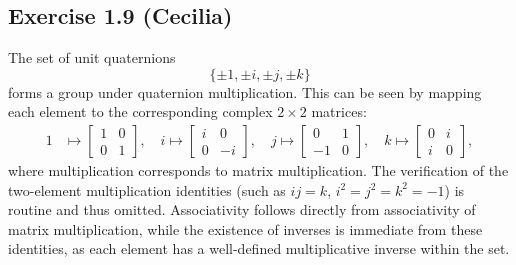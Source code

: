 \subsection*{Exercise 1.9 (Cecilia)}

The set of unit quaternions 
\[
\{\pm 1, \pm i, \pm j, \pm k\}
\]
forms a group under quaternion multiplication. This can be seen by mapping each element to the corresponding complex $2 \times 2$ matrices:
\[
\begin{aligned}
1 &\mapsto \begin{bmatrix} 1 & 0 \\ 0 & 1 \end{bmatrix}, \quad
i \mapsto \begin{bmatrix} i & 0 \\ 0 & -i \end{bmatrix}, \quad
j \mapsto \begin{bmatrix} 0 & 1 \\ -1 & 0 \end{bmatrix}, \quad
k \mapsto \begin{bmatrix} 0 & i \\ i & 0 \end{bmatrix},
\end{aligned}
\]
where multiplication corresponds to matrix multiplication. The verification of the two-element multiplication identities (such as $ij = k$, $i^2 = j^2 = k^2 = -1$) is routine and thus omitted. Associativity follows directly from associativity of matrix multiplication, while the existence of inverses is immediate from these identities, as each element has a well-defined multiplicative inverse within the set.
